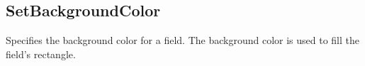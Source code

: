 \documentclass[letterpaper,12pt,english,openany,oneside]{sphinxmanual}
\begin{document}
\subsection{SetBackgroundColor}
\label{\detokenize{IAC_API_FormsIntro:setbackgroundcolor}}
Specifies the background color for a field. The background color is used to fill the field’s rectangle.

\label{\detokenize{IAC_API_FormsIntro:syntax-1}}

\begin{sphinxVerbatim}[commandchars=\\\{\}]
           
\end{sphinxVerbatim}
\label{\detokenize{IAC_API_FormsIntro:parameters-1}}
\end{document}
